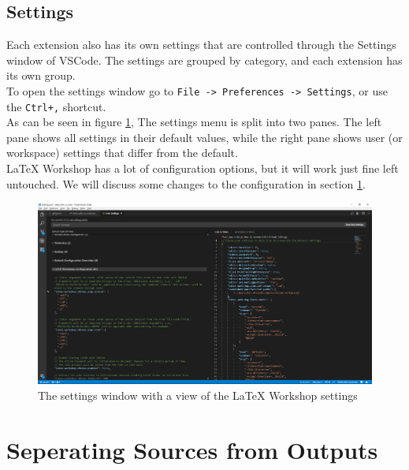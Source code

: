 \documentclass{article}
\newcommand{\latex}{\LaTeX\xspace}
\begin{document}
\subsection{Settings}
Each extension also has its own settings that are controlled through the Settings window of VSCode. The settings are grouped by category, and each extension has its own group.\\
To open the settings window go to \texttt{File -> Preferences -> Settings}, or use the \texttt{Ctrl+,} shortcut.\\
As can be seen in figure \ref{fig:settings_window}, The settings menu is split into two panes. The left pane shows all settings in their default values, while the right pane shows user (or workspace) settings that differ from the default.\\
\latex Workshop has a lot of configuration options, but it will work just fine left untouched. We will discuss some changes to the configuration in section \ref{sec:seperating_sources_from_outputs}.
\begin{figure}
	\includegraphics[width=\linewidth]{../resources/settings_window.png}
	\caption{The settings window with a view of the \latex Workshop settings}
	\label{fig:settings_window}
\end{figure}


\section{Seperating Sources from Outputs} \label{sec:seperating_sources_from_outputs}
\end{document}
